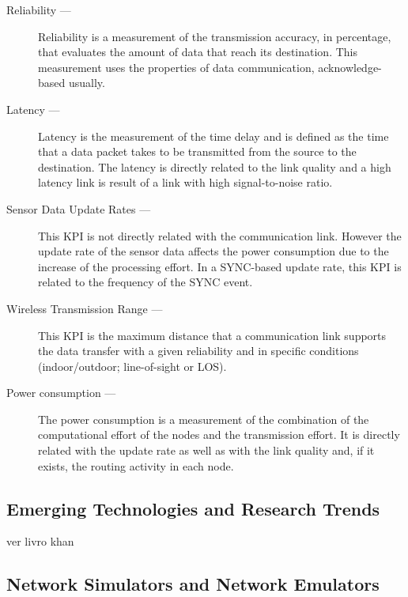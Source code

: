 \begin{description}
	\item[Reliability ---] Reliability is a measurement of the transmission accuracy, in percentage, that evaluates the amount of data that reach its destination. This measurement uses the properties of data communication, acknowledge-based usually.
	
	\item[Latency ---] Latency is the measurement of the time delay and is defined as the time that a data packet takes to be transmitted from the source to the destination. The latency is directly related to the link quality and a high latency link is result of a link with high signal-to-noise ratio. 
	
	\item[Sensor Data Update Rates ---] This KPI is not directly related with the communication link. However the update rate of the sensor data affects the power consumption due to the increase of the processing effort. In a SYNC-based update rate, this KPI is related to the frequency of the SYNC event.
	
	\item[Wireless Transmission Range ---] This KPI is the maximum distance that a communication link supports the data transfer with a given reliability and in specific conditions (indoor/outdoor; line-of-sight or LOS).
	
	\item[Power consumption ---] The power consumption is a measurement of the combination of the computational effort of the nodes and the transmission effort. It is directly related with the update rate as well as with the link quality and, if it exists, the routing activity in each node.
	
\end{description}

\subsection{Emerging Technologies and Research Trends}

ver livro khan

\subsection{Network Simulators and Network Emulators}

